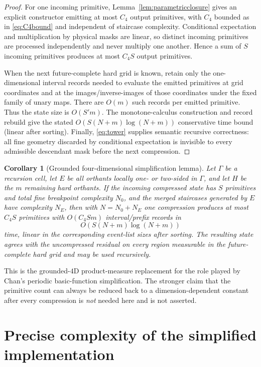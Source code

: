 \documentclass[12pt,a4paper]{article}
\newtheorem{corollary}[theorem]{Corollary}
\theoremstyle{definition}
\newcommand{\1}{\mathbf 1}
\begin{document}
\begin{proof}
For one incoming primitive, Lemma~\ref{lem:parametricclosure} gives an explicit constructor emitting at most $C_4$ output primitives, with $C_4$ bounded as in \eqref{eq:C4bound} and independent of staircase complexity. Conditional expectation and multiplication by physical masks are linear, so distinct incoming primitives are processed independently and never multiply one another. Hence a sum of $S$ incoming primitives produces at most $C_4S$ output primitives.

When the next future-complete hard grid is known, retain only the one-dimensional interval records needed to evaluate the emitted primitives at grid coordinates and at the images/inverse-images of those coordinates under the fixed family of unary maps. There are $O(m)$ such records per emitted primitive. Thus the state size is $O(S'm)$. The monotone-calculus construction and record rebuild give the stated $O(S(N+m)\log(N+m))$ conservative time bound (linear after sorting). Finally, \eqref{eq:tower} supplies semantic recursive correctness: all fine geometry discarded by conditional expectation is invisible to every admissible descendant mask before the next compression.
\end{proof}

\begin{corollary}[Grounded four-dimensional simplification lemma] \label{cor:simplification}
Let $\Gamma$ be a recursion cell, let $E$ be all orthants locally one- or two-sided in $\Gamma$, and let $H$ be the $m$ remaining hard orthants.  If the incoming compressed state has $S$ primitives and total fine breakpoint complexity $N_0$, and the merged staircases generated by $E$ have complexity $N_E$, then with $N=N_0+N_E$ one compression produces at most $C_4S$ primitives with $O(C_4Sm)$ interval/prefix records in
\[
O(S(N+m)\log(N+m))
\]
time, linear in the corresponding event-list sizes after sorting.  The resulting state agrees with the uncompressed residual on every region measurable in the future-complete hard grid and may be used recursively.
\end{corollary}

This is the grounded-$4$D product-measure replacement for the role played by Chan's periodic basic-function simplification.  The stronger claim that the primitive count can always be reduced back to a dimension-dependent constant after every compression is \emph{not} needed here and is not asserted.

\section{Precise complexity of the simplified implementation}
\end{document}

